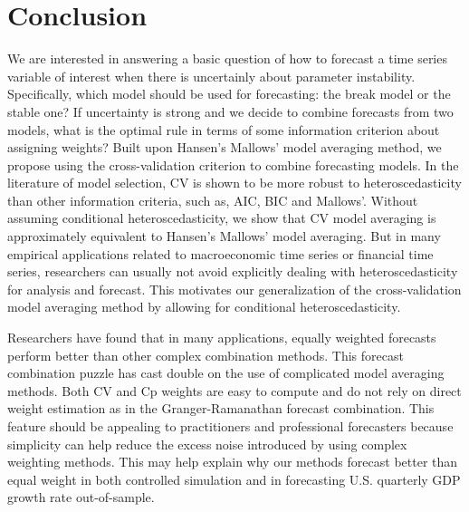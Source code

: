 \section{Conclusion}
We are interested in answering a basic question of how to forecast a time series variable of interest when there is uncertainly about parameter instability. Specifically, which model should be used for forecasting: the break model or the stable one? If uncertainty is strong and we decide to combine forecasts from two models, what is the optimal rule in terms of some information criterion about assigning weights? Built upon Hansen's Mallows' model averaging method, we propose using the cross-validation criterion to combine forecasting models. In the literature of model selection, CV is shown to be more robust to heteroscedasticity than other information criteria, such as, AIC, BIC and Mallows'. Without assuming conditional heteroscedasticity, we show that CV model averaging is approximately equivalent to Hansen's Mallows' model averaging. But in many empirical applications related to macroeconomic time series or financial time series, researchers can usually not avoid explicitly dealing with heteroscedasticity for analysis and forecast. This motivates our generalization of the cross-validation model averaging method by allowing for conditional heteroscedasticity.

Researchers have found that in many applications, equally weighted forecasts perform better than other complex combination methods. This forecast combination puzzle has cast double on the use of complicated model averaging methods. Both CV and Cp weights are easy to compute and do not rely on direct weight estimation as in the Granger-Ramanathan forecast combination. This feature should be appealing to practitioners and professional forecasters because simplicity can help reduce the excess noise introduced by using complex weighting methods. This may help explain why our methods forecast better than equal weight in both controlled simulation and in forecasting U.S. quarterly GDP growth rate out-of-sample.

